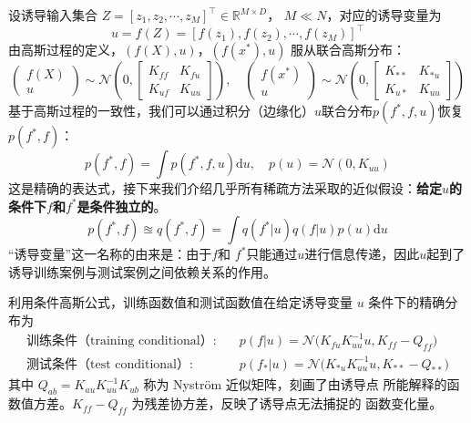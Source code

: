 设诱导输入集合 $Z = [z_1, z_2, \cdots, z_M]^\top \in \mathbb{R}^{M \times D}$，
$M \ll N$，对应的诱导变量为
\begin{equation}
    u = f(Z) = [f(z_1), f(z_2), \cdots, f(z_M)]^\top
\end{equation}
由高斯过程的定义，$(f(X), u)$，$(f(x^*), u)$ 服从联合高斯分布：
\begin{equation}
    \begin{pmatrix} f(X) \\ u \end{pmatrix} \sim \mathcal{N}
    \left(0, \begin{bmatrix} K_{ff} & K_{fu} \\ K_{uf} & K_{uu} \end{bmatrix}\right), \quad 
    \begin{pmatrix} f(x^*) \\ u \end{pmatrix} \sim \mathcal{N}
    \left(0, \begin{bmatrix} K_{**} & K_{*u} \\ K_{u*} & K_{uu} \end{bmatrix}\right)
\end{equation}
基于高斯过程的一致性，我们可以通过积分（边缘化）$u$联合分布$p(f^*, f, u)$恢复$p(f^*, f)$：
\begin{equation}
    p(f^*, f) = \int p(f^*, f, u) \mathrm{d}u, \quad p(u) = \mathcal N(0, K_{uu})
\end{equation}
这是精确的表达式，接下来我们介绍几乎所有稀疏方法采取的近似假设：\textbf{给定$u$的条件下$f$和$f^*$是条件独立的}。
\begin{equation}
    p(f^*, f) \approxeq q(f^*, f) = \int q(f^* | u) q(f | u) p(u) \mathrm{d}u
\end{equation}
“诱导变量”这一名称的由来是：由于$f$和 $f^*$只能通过$u$进行信息传递，因此$u$起到了诱导训练案例与测试案例之间依赖关系的作用。


利用条件高斯公式，训练函数值和测试函数值在给定诱导变量 $u$ 条件下的精确分布为
\begin{equation} \label{eq:conditionals}
\begin{aligned}
    \text{训练条件（training conditional）}: &\quad p({f}|{u}) = \mathcal N \big (K_{fu} K_{uu}^{-1} u, 
    K_{ff} - Q_{ff} \big ) \\
    \text{测试条件（test conditional）}: &\quad p({f}_*|{u}) = \mathcal N \big (K_{*u} K_{uu}^{-1} u, 
    K_{**} - Q_{**} \big )
\end{aligned}
\end{equation}
其中 $Q_{ab} = K_{au} K_{uu}^{-1} K_{ub}$ 称为 Nyström 近似矩阵，刻画了由诱导点
所能解释的函数值方差。$K_{ff} - Q_{ff}$ 为残差协方差，反映了诱导点无法捕捉的
函数变化量。

